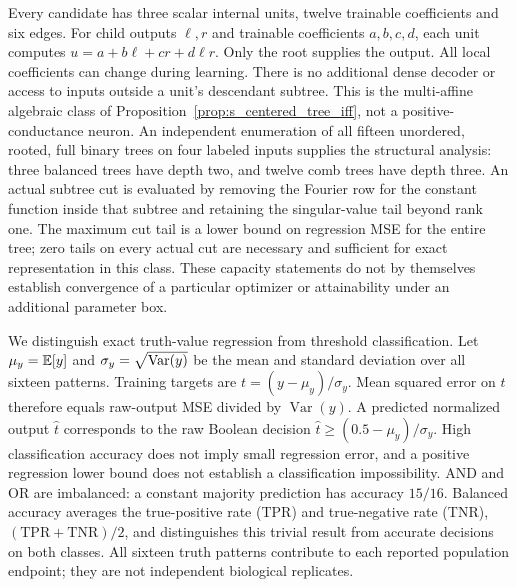 Every candidate has three scalar internal units, twelve trainable
coefficients and six edges. For child outputs $\ell,r$ and trainable coefficients $a,b,c,d$, each
unit computes $u=a+b\ell+cr+d\ell r$. Only the root supplies the output. All local coefficients can change during learning. There is no
additional dense decoder or access to inputs outside a unit's descendant
subtree. This is the multi-affine algebraic class of
Proposition~\ref{prop:s_centered_tree_iff}, not a positive-conductance neuron.
An independent enumeration of all fifteen unordered, rooted, full binary
trees on four labeled inputs supplies the structural analysis: three balanced
trees have depth two, and twelve comb trees have depth three. An actual subtree
cut is evaluated by removing the Fourier row for the constant function
inside that subtree and retaining the singular-value tail beyond rank one. The maximum cut tail is a lower bound
on regression MSE for the entire tree; zero tails on every actual cut are
necessary and sufficient for exact representation in this class. These
capacity statements do not by themselves establish convergence of a
particular optimizer or attainability under an additional parameter box.

We distinguish exact truth-value regression from threshold classification.
Let $\mu_y=\mathbb{E}[y]$ and $\sigma_y=\sqrt{\operatorname{Var}(y)}$ be the mean and
standard deviation over all sixteen patterns. Training targets are
$t=(y-\mu_y)/\sigma_y$. Mean squared error on $t$ therefore equals raw-output MSE
divided by $\operatorname{Var}(y)$. A predicted normalized output $\hat t$
corresponds to the raw Boolean decision
$\hat t\geq(0.5-\mu_y)/\sigma_y$. High classification accuracy does not imply
small regression error, and a positive regression lower bound does not
establish a classification impossibility. AND and OR are imbalanced: a
constant majority prediction has accuracy $15/16$. Balanced accuracy averages the true-positive rate (TPR) and true-negative
rate (TNR), $(\mathrm{TPR}+\mathrm{TNR})/2$, and distinguishes this trivial result from
accurate decisions on both classes. All sixteen truth patterns contribute
to each reported population endpoint; they are not independent biological
replicates.

